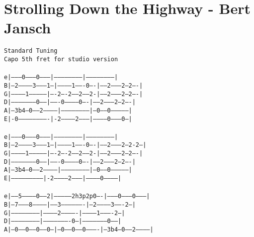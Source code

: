\newpage
\section{Strolling Down the Highway - Bert Jansch}
\label{Strolling Down the Highway - Bert Jansch}
\texttt{Standard\ Tuning\\
Capo\ 5th\ fret\ for\ studio\ version\\
\\
e|---------0--------0--------|------------------------|------------------------|\\
B|---2-----------3--------1--|-----------1-------0----|------2--------2---2----|\\
G|------------1--------------|----2----2------2-----2-|------2--------2---2----|\\
D|--------------------0------|-------0-----------0----|------2--------2---2----|\\
A|---3b4---0-----2-----------|------------------------|---0-----0--------------|\\
E|-0-------------------------|-2------------2---------|------------0--------0--|\\
\\
e|---------0--------0--------|------------------------|------------------------|\\
B|---2-----------3--------1--|-----------1-------0----|------2--------2---2-2--|\\
G|------------1--------------|----2----2------2-----2-|------2--------2---2----|\\
D|--------------------0------|-------0-----------0----|------2--------2---2----|\\
A|---3b4---0-----2-----------|------------------------|---0-----0--------------|\\
E|---------------------------|-2------------2---------|------------0-----------|\\
\\
e|-----5-----------0-----2|--------------2h3p2p0----|--------0--------0--------|\\
B|--7--------8------------|-----3-------------------|--2-----------3-------2---|\\
G|------------------------|-----------2-------------|-----------1----------2---|\\
D|------------------------|----------------------0--|--------------------0-----|\\
A|--0-----0-----0-----0---|--0-----0-----0----------|--3b4---0-----2-----------|\\
}
